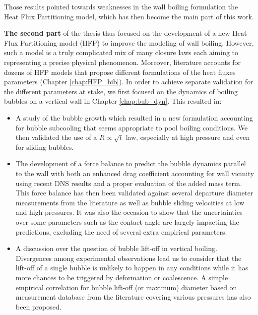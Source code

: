 Those results pointed towards weaknesses in the wall boiling formulation \ie the Heat Flux Partitioning model, which has then become the main part of this work.

\npar

\textbf{The second part} of the thesis thus focused on the development of a new Heat Flux Partitioning model (HFP) to improve the modeling of wall boiling. However, such a model is a truly complicated mix of many closure laws each aiming to representing a precise physical phenomenon. Moreover, literature accounts for dozens of HFP models that propose different formulations of the heat fluxes parameters (Chapter \ref{chap:HFP_bib}). In order to achieve separate validation for the different parameters at stake, we first focused on the dynamics of boiling bubbles on a vertical wall in Chapter \ref{chap:bub_dyn}. This resulted in:

\begin{itemize}
\item A study of the bubble growth which resulted in a new formulation accounting for bubble subcooling that seems appropriate to pool boiling conditions. We then validated the use of a $R \propto \sqrt{t}$ law, especially at high pressure and even for sliding bubbles.

\item The development of a force balance to predict the bubble dynamics parallel to the wall with both an enhanced drag coefficient accounting for wall vicinity using recent DNS results \cite{shi_drag_2021} and a proper evaluation of the added mass term. This force balance has then been validated against several departure diameter measurements from the literature as well as bubble sliding velocities at low and high pressures. It was also the occasion to show that the uncertainties over some parameters such as the contact angle are largely impacting the predictions, excluding the need of several extra empirical parameters.

\item A discussion over the question of bubble lift-off in vertical boiling. Divergences among experimental observations lead us to consider that the lift-off of a single bubble is unlikely to happen in any conditions while it has more chances to be triggered by deformation or coalescence. A simple empirical correlation for bubble lift-off (or maximum) diameter based on measurement database from the literature covering various pressures has also been proposed.
\end{itemize}

